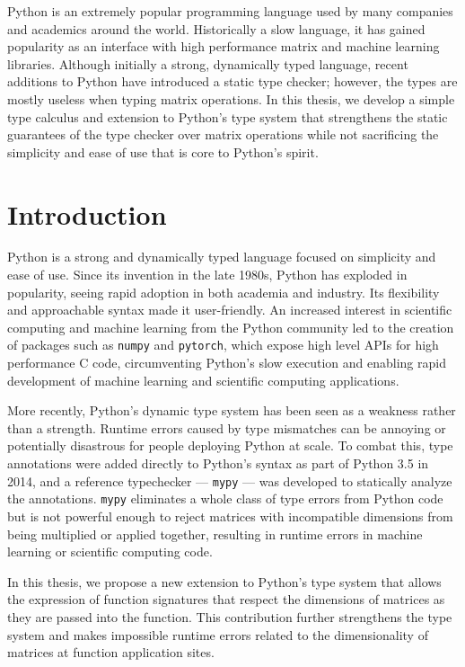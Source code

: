 \documentclass{report}
\begin{document}
\tableofcontents
\newpage

    Python is an extremely popular programming language used by many companies and academics around the world. Historically a slow language, it has gained popularity as an interface with high performance matrix and machine learning libraries. Although initially a strong, dynamically typed language, recent additions to Python have introduced a static type checker; however, the types are mostly useless when typing matrix operations. In this thesis, we develop a simple type calculus and extension to Python's type system that strengthens the static guarantees of the type checker over matrix operations while not sacrificing the simplicity and ease of use that is core to Python's spirit.

\section{Introduction}

Python is a strong and dynamically typed language focused on simplicity and ease of use. Since its invention in the late 1980s, Python has exploded in popularity, seeing rapid adoption in both academia and industry. Its flexibility and approachable syntax made it user-friendly. An increased interest in scientific computing and machine learning from the Python community led to the creation of packages such as \texttt{numpy} and \texttt{pytorch}, which expose high level APIs for high performance C code, circumventing Python's slow execution and enabling rapid development of machine learning and scientific computing applications.

More recently, Python's dynamic type system has been seen as a weakness rather than a strength. Runtime errors caused by type mismatches can be annoying or potentially disastrous for people deploying Python at scale. To combat this, type annotations were added directly to Python's syntax as part of Python 3.5 in 2014, and a reference typechecker --- \texttt{mypy} --- was developed to statically analyze the annotations. \texttt{mypy} eliminates a whole class of type errors from Python code but is not powerful enough to reject matrices with incompatible dimensions from being multiplied or applied together, resulting in runtime errors in machine learning or scientific computing code.

In this thesis, we propose a new extension to Python's type system that allows the expression of function signatures that respect the dimensions of matrices as they are passed into the function. This contribution further strengthens the type system and makes impossible runtime errors related to the dimensionality of matrices at function application sites.
\end{document}
